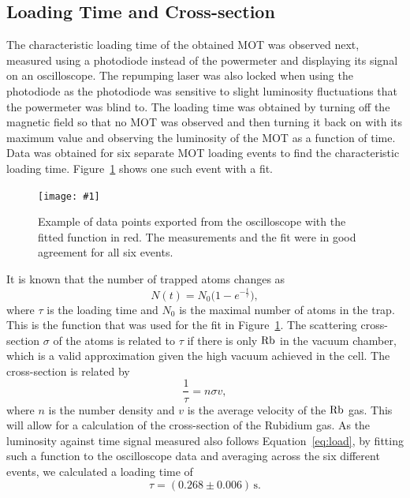 \documentclass[twocolumn]{article}
\newcommand{\insertFigure}[1]{%
   \texttt{[image: \#1]}%
}
\begin{document}
\subsection{Loading Time and Cross-section}
The characteristic loading time of the obtained MOT was observed next, measured using a photodiode instead of the powermeter and displaying its signal on an oscilloscope. The repumping laser was also locked when using the photodiode as the photodiode was sensitive to slight luminosity fluctuations that the powermeter was blind to. The loading time was obtained by turning off the magnetic field so that no MOT was observed and then turning it back on with its maximum value and observing the luminosity of the MOT as a function of time. Data was obtained for six separate MOT loading events to find the characteristic loading time. Figure~\ref{fig:buildup} shows one such event with a fit. 
\begin{figure} [!h]
	\centering
	\insertFigure{Images/mot_buildup.png}
	\caption{Example of data points exported from the oscilloscope with the fitted function in red. The measurements and the fit were in good agreement for all six events.}
	\label{fig:buildup}
\end{figure}
It is known that the number of trapped atoms changes as~\cite{Wieman} 
\begin{equation}\label{eq:load}
N(t) = N_0 \big( 1 - e^{-\frac{t}{\tau}} \big),
\end{equation}
where $\tau$ is the loading time and $N_0$ is the maximal number of atoms in the trap. This is the function that was used for the fit in Figure~\ref{fig:buildup}. The scattering cross-section $\sigma$ of the atoms is related to $\tau$ if there is only $\ce{Rb}$ in the vacuum chamber, which is a valid approximation given the high vacuum achieved in the cell. The cross-section is related by
\begin{equation}\label{eq:cross-section}
\frac{1}{\tau} = n \sigma v, \nonumber
\end{equation}
where $n$ is the number density and $v$ is the average velocity of the $\ce{Rb}$ gas. This will allow for a calculation of the cross-section of the Rubidium gas. As the luminosity against time signal measured also follows Equation~\ref{eq:load}, by fitting such a function to the oscilloscope data and averaging across the six different events, we calculated a loading time of 
\begin{equation}
\tau = (0.268 \pm 0.006) \, \text{s}.\nonumber
\end{equation}
\end{document}

